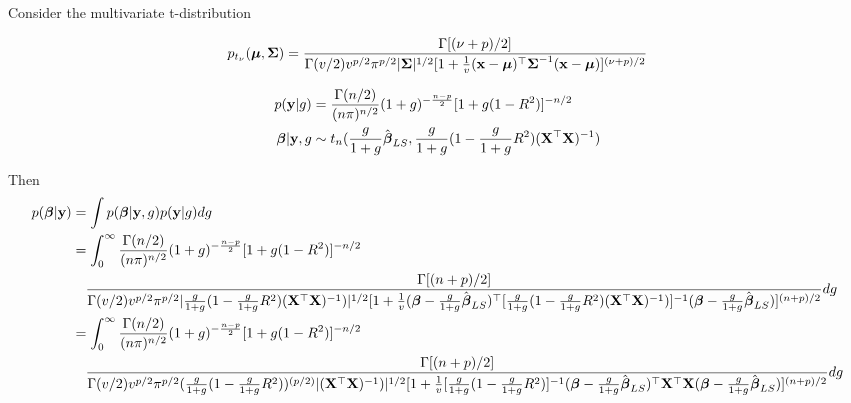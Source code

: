 \documentclass{amsart}[12pt]
\begin{document}
Consider the multivariate t-distribution

\begin{equation}
	p_{t_\nu}({\boldsymbol \mu}, {\boldsymbol \Sigma}) = \frac{\Gamma[(\nu + p)/2]}{\Gamma(v/2) v^{p/2} \pi^{p/2} |{\boldsymbol \Sigma}|^{1/2} [1 + \frac{1}{v}({\bf x} - {\boldsymbol \mu})^\top {\boldsymbol\Sigma}^{-1} ({\bf x} - {\boldsymbol \mu})]^{(\nu + p)/2}}
\end{equation}

\begin{align*}
	p({\bf y} | g)      & = \frac{\Gamma(n/2)}{(n \pi)^{n/2}} (1 + g)^{-\frac{n - p}{2}} [1 + g(1 - R^2)]^{-n/2}                     \\
	{\boldsymbol \beta} | {\bf y}, g & \sim t_n(\frac{g}{1 + g} \hat{{\boldsymbol \beta}}_{LS}, \frac{g}{1 + g} (1 - \frac{g}{1 + g} R^2) ({\bf X}^\top {\bf X})^{-1}) \\
\end{align*}

Then
\small
\begin{align*}
	p({\boldsymbol \beta} | {\bf y}) & = \int p({\boldsymbol \beta} | {\bf y}, g) p({\bf y} | g) dg                                                                                                                                                                                                                                                                                                     \\
	                & = \int_0^\infty \frac{\Gamma(n/2)}{(n \pi)^{n/2}} (1 + g)^{-\frac{n - p}{2}} [1 + g(1 - R^2)]^{-n/2}                                                                                                                                                                                                                                        \\
	                & \quad \frac{\Gamma[(n + p)/2]}{\Gamma(v/2) v^{p/2} \pi^{p/2} |\frac{g}{1 + g} (1 - \frac{g}{1 + g} R^2) ({\bf X}^\top {\bf X})^{-1})|^{1/2} [1 + \frac{1}{v}({\boldsymbol \beta} - \frac{g}{1 + g} \hat{{\boldsymbol \beta}}_{LS})^\top [\frac{g}{1 + g} (1 - \frac{g}{1 + g} R^2) ({\bf X}^\top {\bf X})^{-1})]^{-1} ({\boldsymbol \beta} - \frac{g}{1 + g} \hat{{\boldsymbol \beta}}_{LS})]^{(n + p)/2}} dg   \\
	                & = \int_0^\infty \frac{\Gamma(n/2)}{(n \pi)^{n/2}} (1 + g)^{-\frac{n - p}{2}} [1 + g(1 - R^2)]^{-n/2}                                                                                                                                                                                                                                        \\
	                & \quad \frac{\Gamma[(n + p)/2]}{\Gamma(v/2) v^{p/2} \pi^{p/2} (\frac{g}{1 + g} (1 - \frac{g}{1 + g} R^2))^{(p/2)} |({\bf X}^\top {\bf X})^{-1})|^{1/2} [1 + \frac{1}{v} [\frac{g}{1 + g} (1 - \frac{g}{1 + g} R^2)]^{-1}({\boldsymbol \beta} - \frac{g}{1 + g} \hat{{\boldsymbol \beta}}_{LS})^\top {\bf X}^\top {\bf X} ({\boldsymbol \beta} - \frac{g}{1 + g} \hat{{\boldsymbol \beta}}_{LS})]^{(n + p)/2}} dg \\
\end{align*}
\end{document}
